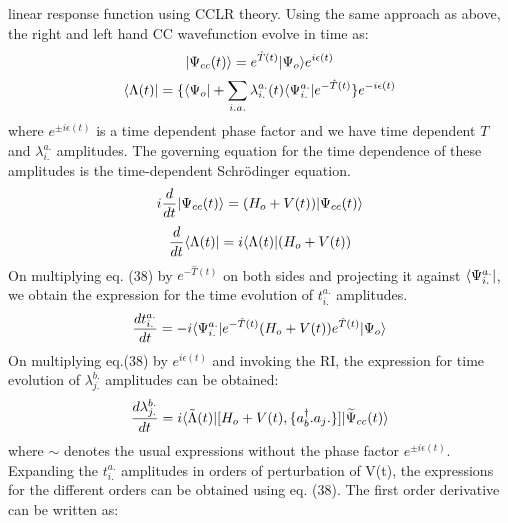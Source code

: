 linear response function using CCLR theory.
Using the same approach as above, the right and left hand CC wavefunction evolve in time as\cite{Koch90}:
\begin{equation}
| \Psi_{cc}(t) \rangle = e^{\hat{T}(t)}| \Psi_o \rangle e^{i\epsilon(t)}
\end{equation}
\begin{equation} \langle \Lambda(t) | = \{\langle \Psi_o | +
\sum_{i.a.}\lambda^{a.}_{i.}(t)\langle \Psi^{a.}_{i.} |e^{-\hat{T}(t)}\}e^{-i\epsilon(t)}
\end{equation}
where $e^{\pm i\epsilon(t)}$ is a time dependent phase factor
and we have time dependent $T$ and $\lambda^{a.}_{i.}$ amplitudes. The governing equation for 
the time dependence of these amplitudes is the time-dependent Schr\"odinger equation.
\begin{equation}
i\frac{d}{dt}| \Psi_{cc}(t) \rangle = (H_o + V(t))| \Psi_{cc}(t) \rangle 
\end{equation}
\begin{equation}
\frac{d}{dt}\langle \Lambda(t) | = i\langle \Lambda(t) |(H_o + V(t))
\end{equation}
On multiplying eq. (38) by $e^{-\hat{T}(t)}$ on both sides and projecting 
it against $\langle \Psi^{a.}_{i.} |$, we obtain the expression for the time evolution 
of $t^{a.}_{i.}$ amplitudes.
\begin{equation}
\frac{dt^{a.}_{i.}}{dt} = -i\langle \Psi^{a.}_{i.} |e^{-\hat{T}(t)}(H_o + V(t))e^{\hat{T}(t)}| \Psi_o \rangle
\end{equation}
On multiplying eq.(38) by $e^{i\epsilon(t)}$ and invoking the RI, the expression for 
time evolution of $\lambda^{b.}_{j.}$ amplitudes can be obtained:
\begin{equation}
\frac{d\lambda^{b.}_{j.}}{dt} =
i\langle {\tilde{\Lambda}}(t) |\lbrack H_o + V(t),\{{a}^\dagger_b.
a_j.\}\rbrack| {\widetilde{\Psi}_{cc}}(t) \rangle
\end{equation} 
where $\sim$ denotes the usual expressions without the phase factor $e^{\pm i\epsilon(t)}$. 
Expanding the $t^{a.}_{i.}$ amplitudes in orders of perturbation of V(t), the 
expressions for the different orders can be obtained using eq. (38). The first order
derivative can be written as:
